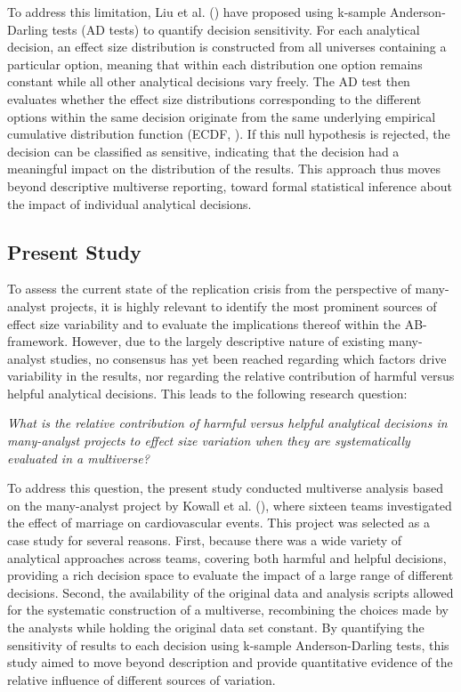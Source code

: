 \documentclass[
  man,
  floatsintext,
  longtable,
  nolmodern,
  notxfonts,
  notimes,
  colorlinks=true,linkcolor=blue,citecolor=blue,urlcolor=blue]{apa7}
\begin{document}
To address this limitation, Liu et al.
() have proposed using
k-sample Anderson-Darling tests (AD tests) to quantify decision
sensitivity. For each analytical decision, an effect size distribution
is constructed from all universes containing a particular option,
meaning that within each distribution one option remains constant while
all other analytical decisions vary freely. The AD test then evaluates
whether the effect size distributions corresponding to the different
options within the same decision originate from the same underlying
empirical cumulative distribution function (ECDF,
). If this
null hypothesis is rejected, the decision can be classified as
sensitive, indicating that the decision had a meaningful impact on the
distribution of the results. This approach thus moves beyond descriptive
multiverse reporting, toward formal statistical inference about the
impact of individual analytical decisions.

\subsection{Present Study}\label{present-study}

To assess the current state of the replication crisis from the
perspective of many-analyst projects, it is highly relevant to identify
the most prominent sources of effect size variability and to evaluate
the implications thereof within the AB-framework. However, due to the
largely descriptive nature of existing many-analyst studies, no
consensus has yet been reached regarding which factors drive variability
in the results, nor regarding the relative contribution of harmful
versus helpful analytical decisions. This leads to the following
research question:

\emph{What is the relative contribution of harmful versus helpful
analytical decisions in many-analyst projects to effect size variation
when they are systematically evaluated in a multiverse?}

To address this question, the present study conducted multiverse
analysis based on the many-analyst project by Kowall et al.
(), where sixteen teams
investigated the effect of marriage on cardiovascular events. This
project was selected as a case study for several reasons. First, because
there was a wide variety of analytical approaches across teams, covering
both harmful and helpful decisions, providing a rich decision space to
evaluate the impact of a large range of different decisions. Second, the
availability of the original data and analysis scripts allowed for the
systematic construction of a multiverse, recombining the choices made by
the analysts while holding the original data set constant. By
quantifying the sensitivity of results to each decision using k-sample
Anderson-Darling tests, this study aimed to move beyond description and
provide quantitative evidence of the relative influence of different
sources of variation.
\end{document}
